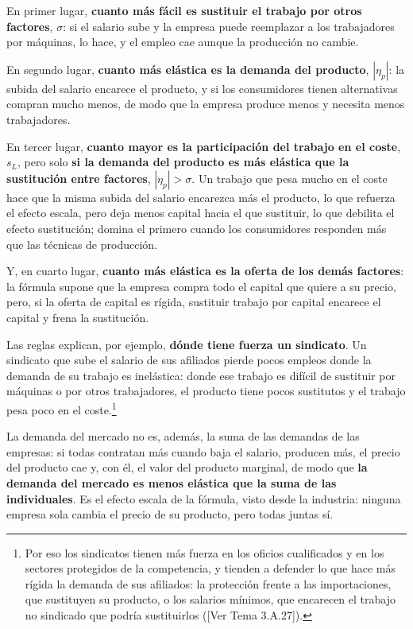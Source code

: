 \documentclass[10pt,a4paper]{article}
\newcommand{\authorfont}[1]{{\fontfamily{EBGaramond-TLF}\selectfont #1}}
\begin{document}
En primer lugar, \textbf{cuanto más fácil es sustituir el trabajo por otros factores}, $\sigma$: si el salario sube y la empresa puede reemplazar a los trabajadores por máquinas, lo hace, y el empleo cae aunque la producción no cambie. 

En segundo lugar, \textbf{cuanto más elástica es la demanda del producto}, $|\eta_p|$: la subida del salario encarece el producto, y si los consumidores tienen alternativas compran mucho menos, de modo que la empresa produce menos y necesita menos trabajadores.

En tercer lugar, \textbf{cuanto mayor es la participación del trabajo en el coste}, $s_L$, pero solo \textbf{si la demanda del producto es más elástica que la sustitución entre factores}, $|\eta_p|>\sigma$. Un trabajo que pesa mucho en el coste hace que la misma subida del salario encarezca más el producto, lo que refuerza el efecto escala, pero deja menos capital hacia el que sustituir, lo que debilita el efecto sustitución; domina el primero cuando los consumidores responden más que las técnicas de producción. 

Y, en cuarto lugar, \textbf{cuanto más elástica es la oferta de los demás factores}: la fórmula supone que la empresa compra todo el capital que quiere a su precio, pero, si la oferta de capital es rígida, sustituir trabajo por capital encarece el capital y frena la sustitución.

Las reglas explican, por ejemplo, \textbf{dónde tiene fuerza un sindicato}. Un sindicato que sube el salario de sus afiliados pierde pocos empleos donde la demanda de su trabajo es inelástica: donde ese trabajo es difícil de sustituir por máquinas o por otros trabajadores, el producto tiene pocos sustitutos y el trabajo pesa poco en el coste.\footnote{%
  Por eso los sindicatos tienen más fuerza en los oficios cualificados y en los sectores protegidos de la competencia, y tienden a defender lo que hace más rígida la demanda de sus afiliados: la protección frente a las importaciones, que sustituyen su producto, o los salarios mínimos, que encarecen el trabajo no sindicado que podría sustituirlos ([\authorfont{Ver Tema 3.A.27}]).
}

La demanda del mercado no es, además, la suma de las demandas de las empresas: si todas contratan más cuando baja el salario, producen más, el precio del producto cae y, con él, el valor del producto marginal, de modo que \textbf{la demanda del mercado es menos elástica que la suma de las individuales}. Es el efecto escala de la fórmula, visto desde la industria: ninguna empresa sola cambia el precio de su producto, pero todas juntas sí.
\end{document}
